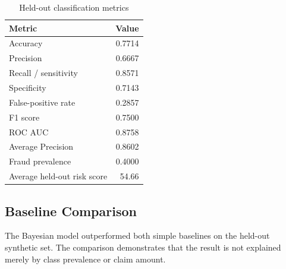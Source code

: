 \begin{table}[htbp]
\centering
\caption{Held-out classification metrics}
\label{tab:heldout_metrics}
\begin{tabular}{|p{6.5cm}|r|}
\hline
\textbf{Metric} & \textbf{Value} \\
\hline
Accuracy & 0.7714 \\
\hline
Precision & 0.6667 \\
\hline
Recall / sensitivity & 0.8571 \\
\hline
Specificity & 0.7143 \\
\hline
False-positive rate & 0.2857 \\
\hline
F1 score & 0.7500 \\
\hline
ROC AUC & 0.8758 \\
\hline
Average Precision & 0.8602 \\
\hline
Fraud prevalence & 0.4000 \\
\hline
Average held-out risk score & 54.66 \\
\hline
\end{tabular}
\end{table}

\subsection{Baseline Comparison}

\begin{table}[htbp]
\centering
\caption{Held-out comparison with simple baselines}
\label{tab:baseline_results}
\end{table}

The Bayesian model outperformed both simple baselines on the held-out synthetic
set. The comparison demonstrates that the result is not explained merely by
class prevalence or claim amount.

